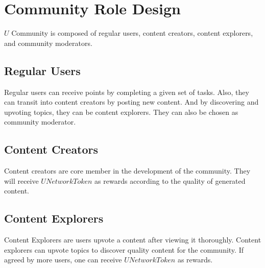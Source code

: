 \section{Community Role Design}
$U$ Community is composed of regular users, content creators, content explorers, and community moderators. 
\subsection{Regular Users}
Regular users can receive points by completing a given set of tasks. Also, they can transit into content creators by posting new content. And by discovering and upvoting topics, they can be content explorers. They can also be chosen as community moderator.  
\subsection{Content Creators}
Content creators are core member in the development of the community. They will receive $UNetworkToken$ as rewards according to the quality of generated content. 
\subsection{Content Explorers}
Content Explorers are users upvote a content after viewing it thoroughly. Content explorers can upvote topics to discover quality content for the community. If agreed by more users, one can receive $UNetworkToken$ as rewards. 

